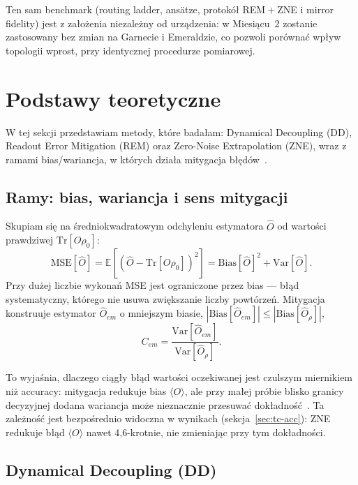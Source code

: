\documentclass[11pt,a4paper]{article}
\begin{document}
Ten sam benchmark (routing ladder, ansätze, protokół REM${}+{}$ZNE i mirror fidelity) jest
z założenia niezależny od urządzenia: w Miesiącu~2 zostanie zastosowany bez zmian na Garnecie
i Emeraldzie, co pozwoli porównać wpływ topologii wprost, przy identycznej procedurze pomiarowej.

\section{Podstawy teoretyczne}

W tej sekcji przedstawiam metody, które badałam:
Dynamical Decoupling (DD), Readout Error Mitigation (REM) oraz Zero-Noise Extrapolation
(ZNE), wraz z ramami bias/wariancja, w których działa mitygacja błędów~\cite{cai2023}.

\subsection{Ramy: bias, wariancja i sens mitygacji}

Skupiam się na średniokwadratowym odchyleniu estymatora $\hat{O}$ od wartości prawdziwej
$\mathrm{Tr}[O\rho_0]$:
\begin{equation}
\mathrm{MSE}[\hat{O}] = \mathbb{E}\!\left[(\hat{O}-\mathrm{Tr}[O\rho_0])^2\right]
= \mathrm{Bias}[\hat{O}]^2 + \mathrm{Var}[\hat{O}].
\end{equation}
Przy dużej liczbie wykonań MSE jest ograniczone przez bias --- błąd systematyczny, którego
nie usuwa zwiększanie liczby powtórzeń. Mitygacja konstruuje estymator $\hat{O}_{em}$
o mniejszym biasie, $|\mathrm{Bias}[\hat{O}_{em}]| \le |\mathrm{Bias}[\hat{O}_\rho]|$,
\begin{equation}
C_{em} = \frac{\mathrm{Var}[\hat{O}_{em}]}{\mathrm{Var}[\hat{O}_\rho]}.
\end{equation}

To wyjaśnia, dlaczego ciągły błąd wartości oczekiwanej jest czulszym miernikiem niż
accuracy: mitygacja redukuje bias $\langle O\rangle$, ale przy małej
próbie blisko granicy decyzyjnej dodana wariancja może nieznacznie przesuwać
dokładność~\cite{cai2023}. Ta zależność jest bezpośrednio widoczna w wynikach
(sekcja~\ref{sec:tc-acc}): ZNE redukuje błąd $\langle O\rangle$ nawet 4,6-krotnie, nie
zmieniając przy tym dokładności.

\subsection{Dynamical Decoupling (DD)}
\end{document}

